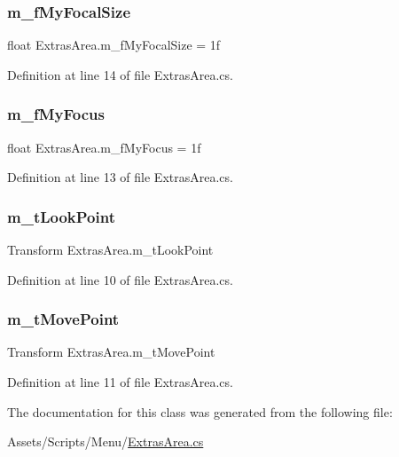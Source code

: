 \subsubsection{\texorpdfstring{m\+\_\+f\+My\+Focal\+Size}{m\_fMyFocalSize}}
{\footnotesize\ttfamily float Extras\+Area.\+m\+\_\+f\+My\+Focal\+Size = 1f}



Definition at line 14 of file Extras\+Area.\+cs.

\mbox{\label{class_extras_area_aabc862a0031c2e3aa6921ea9a4a60b81}} 
\subsubsection{\texorpdfstring{m\+\_\+f\+My\+Focus}{m\_fMyFocus}}
{\footnotesize\ttfamily float Extras\+Area.\+m\+\_\+f\+My\+Focus = 1f}



Definition at line 13 of file Extras\+Area.\+cs.

\mbox{\label{class_extras_area_a25c159aed324b87e3fd0a45a6091bc8b}} 
\subsubsection{\texorpdfstring{m\+\_\+t\+Look\+Point}{m\_tLookPoint}}
{\footnotesize\ttfamily Transform Extras\+Area.\+m\+\_\+t\+Look\+Point}



Definition at line 10 of file Extras\+Area.\+cs.

\mbox{\label{class_extras_area_aec9aa3f2ffb77e4cf45c149b04a6295d}} 
\subsubsection{\texorpdfstring{m\+\_\+t\+Move\+Point}{m\_tMovePoint}}
{\footnotesize\ttfamily Transform Extras\+Area.\+m\+\_\+t\+Move\+Point}



Definition at line 11 of file Extras\+Area.\+cs.



The documentation for this class was generated from the following file\+:\begin{DoxyCompactItemize}
\item 
Assets/\+Scripts/\+Menu/\mbox{\hyperlink{_extras_area_8cs}{Extras\+Area.\+cs}}\end{DoxyCompactItemize}
